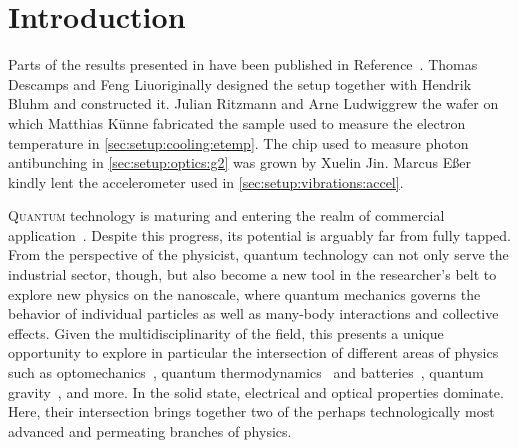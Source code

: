 \chapter{Introduction}\label{ch:setup:introduction}

\begin{partcontribs}
    Parts of the results presented in \thispart have been published in Reference~.
    Thomas Descamps and Feng Liu\sidenotemark[a] originally designed the setup together with Hendrik Bluhm\sidenote[b]{\RWTHFZJ} and constructed it.
    Julian Ritzmann\sidenote[c]{\RUB} and Arne Ludwig\sidenotemark[c] grew the wafer on which Matthias Künne fabricated the sample used to measure the electron temperature in \cref{sec:setup:cooling:etemp}.
    The chip used to measure photon antibunching in \cref{sec:setup:optics:g2} was grown by Xuelin Jin.\sidenote[d]{\FZJ}
    Marcus Eßer\sidenote[e]{\RWTH} kindly lent the accelerometer used in \cref{sec:setup:vibrations:accel}.
\end{partcontribs}

\lettrine[lines=3,lhang=0.33,loversize=0.25,depth=1]{Q}{uantum} technology is maturing and entering the realm of commercial application~\cite{Schleich2016,Mohseni2017,QTBMBF,QTCEN,QTEU}.
Despite this progress, its potential is arguably far from fully tapped.
From the perspective of the physicist, quantum technology can not only serve the industrial sector, though, but also become a new tool in the researcher's belt to explore new physics on the nanoscale, where quantum mechanics governs the behavior of individual particles as well as many-body interactions and collective effects.
Given the multidisciplinarity of the field, this presents a unique opportunity to explore in particular the intersection of different areas of physics such as optomechanics~\cite{Aspelmeyer2014,Barzanjeh2022}, quantum thermodynamics~\cite{Goold2016,Deffner2019,Cangemi2024} and batteries~\cite{Campaioli2024}, quantum gravity~\cite{Degen2017,Bass2024}, and more.
In the solid state, electrical and optical properties dominate.
Here, their intersection brings together two of the perhaps technologically most advanced and permeating branches of physics.

